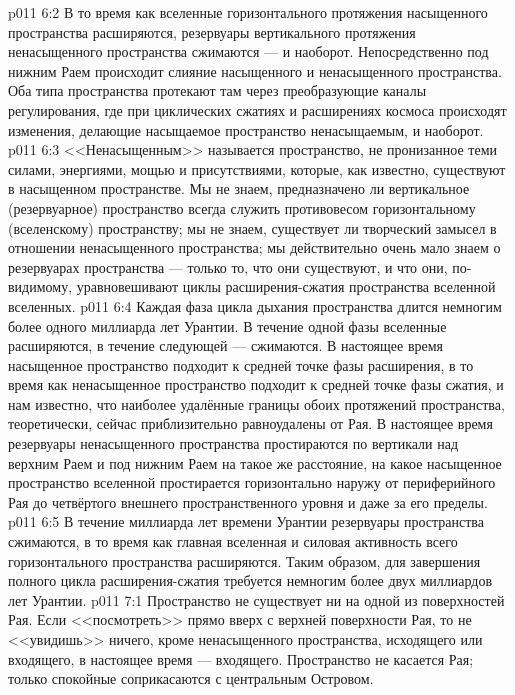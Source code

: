 \vs p011 6:2 В то время как вселенные горизонтального протяжения насыщенного пространства расширяются, резервуары вертикального протяжения ненасыщенного пространства сжимаются --- и наоборот. Непосредственно под нижним Раем происходит слияние насыщенного и ненасыщенного пространства. Оба типа пространства протекают там через преобразующие каналы регулирования, где при циклических сжатиях и расширениях космоса происходят изменения, делающие насыщаемое пространство ненасыщаемым, и наоборот.
\vs p011 6:3 \pc <<Ненасыщенным>> называется пространство, не пронизанное теми силами, энергиями, мощью и присутствиями, которые, как известно, существуют в насыщенном пространстве. Мы не знаем, предназначено ли вертикальное (резервуарное) пространство всегда служить противовесом горизонтальному (вселенскому) пространству; мы не знаем, существует ли творческий замысел в отношении ненасыщенного пространства; мы действительно очень мало знаем о резервуарах пространства --- только то, что они существуют, и что они, по\hyp{}видимому, уравновешивают циклы расширения\hyp{}сжатия пространства вселенной вселенных.
\vs p011 6:4 \pc Каждая фаза цикла дыхания пространства длится немногим более одного миллиарда лет Урантии. В течение одной фазы вселенные расширяются, в течение следующей --- сжимаются. В настоящее время насыщенное пространство подходит к средней точке фазы расширения, в то время как ненасыщенное пространство подходит к средней точке фазы сжатия, и нам известно, что наиболее удалённые границы обоих протяжений пространства, теоретически, сейчас приблизительно равноудалены от Рая. В настоящее время резервуары ненасыщенного пространства простираются по вертикали над верхним Раем и под нижним Раем на такое же расстояние, на какое насыщенное пространство вселенной простирается горизонтально наружу от периферийного Рая до четвёртого внешнего пространственного уровня и даже за его пределы.
\vs p011 6:5 В течение миллиарда лет времени Урантии резервуары пространства сжимаются, в то время как главная вселенная и силовая активность всего горизонтального пространства расширяются. Таким образом, для завершения полного цикла расширения\hyp{}сжатия требуется немногим более двух миллиардов лет Урантии.
\vs p011 7:1 Пространство не существует ни на одной из поверхностей Рая. Если <<посмотреть>> прямо вверх с верхней поверхности Рая, то не <<увидишь>> ничего, кроме ненасыщенного пространства, исходящего или входящего, в настоящее время --- входящего. Пространство не касается Рая; только спокойные  соприкасаются с центральным Островом.
